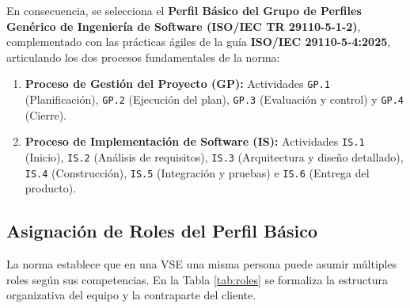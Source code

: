 \documentclass[11pt,a4paper]{article}
\begin{document}
En consecuencia, se selecciona el \textbf{Perfil Básico del Grupo de Perfiles Genérico de Ingeniería de Software (ISO/IEC TR 29110-5-1-2)}, complementado con las prácticas ágiles de la guía \textbf{ISO/IEC 29110-5-4:2025}, articulando los dos procesos fundamentales de la norma:
\begin{enumerate}[noitemsep]
  \item \textbf{Proceso de Gestión del Proyecto (GP):} Actividades \texttt{GP.1} (Planificación), \texttt{GP.2} (Ejecución del plan), \texttt{GP.3} (Evaluación y control) y \texttt{GP.4} (Cierre).
  \item \textbf{Proceso de Implementación de Software (IS):} Actividades \texttt{IS.1} (Inicio), \texttt{IS.2} (Análisis de requisitos), \texttt{IS.3} (Arquitectura y diseño detallado), \texttt{IS.4} (Construcción), \texttt{IS.5} (Integración y pruebas) e \texttt{IS.6} (Entrega del producto).
\end{enumerate}

\subsection{Asignación de Roles del Perfil Básico}
La norma establece que en una VSE una misma persona puede asumir múltiples roles según sus competencias. En la Tabla \ref{tab:roles} se formaliza la estructura organizativa del equipo y la contraparte del cliente.
\end{document}
